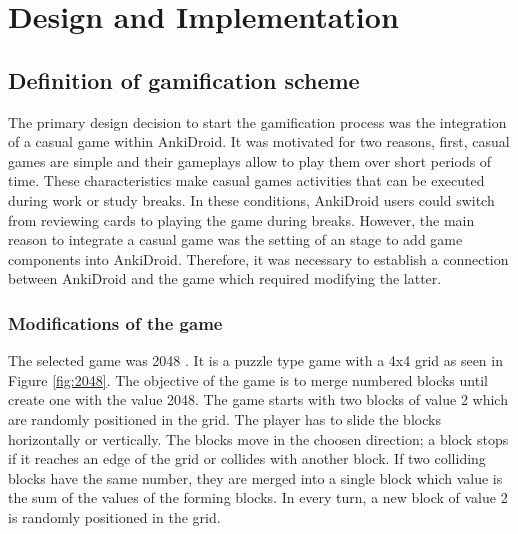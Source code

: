
\chapter{Design and Implementation} %

\label{desi} %


\section{Definition of gamification scheme}

The primary design decision to start the gamification process was the integration of a casual game within AnkiDroid. It was motivated for two reasons, first, casual games are simple and their gameplays allow to play them over short periods of time. These characteristics make casual games activities that can be executed during work or study breaks. In these conditions, AnkiDroid users could switch from reviewing cards to playing the game during breaks. However, the main reason to integrate a casual game was the setting of an stage to add game components into AnkiDroid. Therefore, it was necessary to establish a connection between AnkiDroid and the game which required modifying the latter.

\subsection{Modifications of the game}
The selected game was 2048 \citep{uberspot2017game}. It is a puzzle type game with a 4x4 grid as seen in Figure \ref{fig:2048}. The objective of the game is to merge numbered blocks until create one with the value 2048. The game starts with two blocks of value 2 which are randomly positioned in the grid. The player has to slide the blocks horizontally or vertically. The blocks move in the choosen direction; a block stops if it reaches an edge of the grid or collides with another block. If two colliding blocks have the same number, they are merged into a single block which value is the sum of the values of the forming blocks. In every turn, a new block of value 2 is randomly positioned in the grid.

